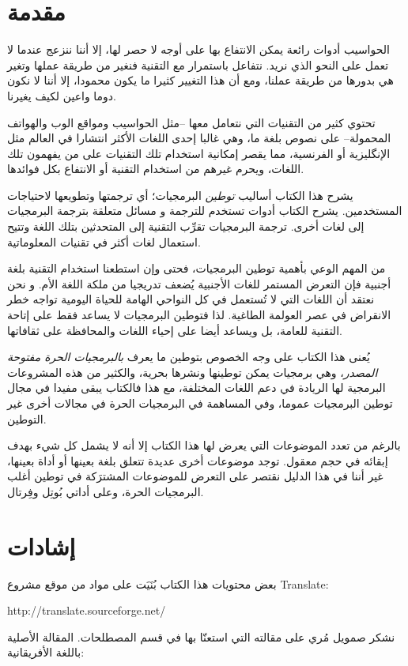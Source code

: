 \section{مقدمة}
الحواسيب أدوات رائعة يمكن الانتفاع بها على أوجه لا حصر لها، إلا أننا
ننزعج عندما لا تعمل على النحو الذي نريد. نتفاعل باستمرار مع التقنية
فنغير من طريقة عملها وتغير هي بدورها من طريقة عملنا، ومع أن هذا التغيير
كثيرا ما يكون محمودا، إلا أننا لا نكون دوما واعين لكيف يغيرنا.

تحتوي كثير من التقنيات التي نتعامل معها --مثل الحواسيب ومواقع الوب
والهواتف المحمولة-- على نصوص بلغة ما، وهي غالبا إحدى اللغات الأكثر
انتشارا في العالم مثل الإنگليزية أو الفرنسية، مما يقصر إمكانية استخدام
تلك التقنيات على من يفهمون تلك اللغات، ويحرم غيرهم من استخدام التقنية
أو الانتفاع بكل فوائدها.

يشرح هذا الكتاب أساليب {\it توطين} البرمجيات؛ أي ترجمتها وتطويعها
لاحتياجات المستخدمين. يشرح الكتاب أدوات تستخدم للترجمة و مسائل متعلقة
بترجمة البرمجيات إلى لغات أخرى. ترجمة البرمجيات تقرِّب التقنية إلى
المتحدثين بتلك اللغة وتتيح استعمال لغات أكثر في تقنيات المعلوماتية.

من المهم الوعي بأهمية توطين البرمجيات، فحتى وإن استطعنا استخدام التقنية
بلغة أجنبية فإن التعرض المستمر للغات الأجنبية يُضعف تدريجيا من ملكة
اللغة الأم. و نحن نعتقد أن اللغات التي لا تُستعمل في كل النواحي الهامة
للحياة اليومية تواجه خطر الانقراض في عصر العولمة الطاغية. لذا فتوطين
البرمجيات لا يساعد فقط على إتاحة التقنية للعامة، بل ويساعد أيضا على
إحياء اللغات والمحافظة على ثقافاتها.

يُعنى هذا الكتاب على وجه الخصوص بتوطين ما يعرف {\it بالبرمجيات الحرة
مفتوحة المصدر}، وهي برمجيات يمكن توطينها ونشرها بحرية، والكثير من هذه
المشروعات البرمجية لها الريادة في دعم اللغات المختلفة، مع هذا فالكتاب
يبقى مفيدا في مجال توطين البرمجيات عموما، وفي المساهمة في البرمجيات
الحرة في مجالات أخرى غير التوطين.

بالرغم من تعدد الموضوعات التي يعرض لها هذا الكتاب إلا أنه لا يشمل كل شيء
بهدف إبقائه في حجم معقول. توجد موضوعات أخرى عديدة تتعلق بلغة بعينها أو
أداة بعينها، غير أننا في هذا الدليل نقتصر على التعرض للموضوعات
المشترَكة في توطين أغلب البرمجيات الحرة، وعلى أداتي بُوتِل وفِرتال.

\section{إشادات}
بعض محتويات هذا الكتاب بُنَيَت على مواد من موقع مشروع Translate:

http://translate.sourceforge.net/

نشكر صمويل مُري على مقالته التي استعنّا بها في قسم المصطلحات. المقالة
الأصلية باللغة الأفريقانية:

